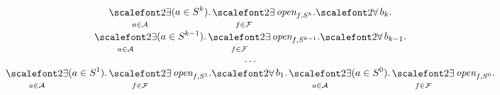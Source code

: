 
\begin{small}
\[
\begin{matrix}
\displaystyle \bigexists_{\a \in \A} \instepcte{\a}{\depth}. \bigexists_{\f\in \F} \openstepcte{\f}{\depth}.%
\displaystyle {\bigforall b_{\depth}.}\\
\displaystyle \bigexists_{\a \in \A} \instepcte{\a}{\depth-1}. \bigexists_{\f\in \F} \openstepcte{\f}{\depth-1}.%
\displaystyle {\bigforall b_{\depth-1}.}\\
\displaystyle \dots\\ 
\displaystyle \bigexists_{\a \in \A} \instepcte{\a}{1}. \bigexists_{\f\in \F} \openstepcte{\f}{1}.%
\displaystyle {\bigforall b_{1}.}%
\displaystyle \bigexists_{\a \in \A} \instepcte{\a}{0}. \bigexists_{\f\in \F} \openstepcte{\f}{0}.
\end{matrix}
\]
\end{small}\\


